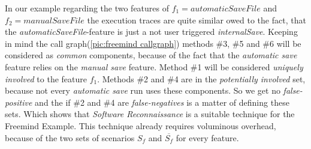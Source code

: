 \emptyLine
In our example regarding the two features of $f_1 = automaticSaveFile$ and $f_2 = manualSaveFile$ the execution traces are quite similar owed to the fact, that the \textit{automaticSaveFile}-feature is just a not user triggered \textit{internalSave}. Keeping in mind the call graph(\autoref{pic:freemind callgraph}) methods \#3, \#5 and \#6 will be considered as \textit{common} components, because of the fact that the \textit{automatic save} feature relies on the \textit{manual save} feature. Method \#1 will be considered \textit{uniquely involved} to the feature $f_1$. Methods \#2 and \#4 are in the \textit{potentially involved} set, because not every \textit{automatic save} run uses these components. So we get no \textit{false-positive} and the if \#2 and \#4 are \textit{false-negatives} is a matter of defining these sets. Which shows that \textit{Software Reconnaissance} is a suitable technique for the Freemind Example.\newline
\emptyLine
This technique already requires voluminous overhead, because of the two sets of scenarios $S_f$ and $\overline{S_f}$ for every feature.


